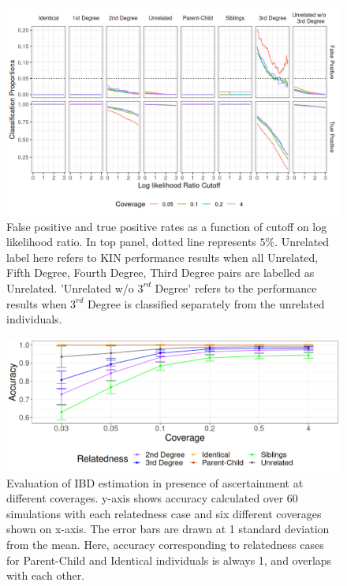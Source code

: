 \documentclass[12pt, letterpaper]{article}
\begin{document}
\begin{figure}[h!]
    \includegraphics[width=16cm]{plots/plotimg/contam0_inbred0_model_performance_allroc_asc0_plot.png}
    \centering
    \caption{False positive and true positive rates as a function of cutoff on log likelihood ratio. In top panel, dotted line represents $5\%$. Unrelated label here refers to KIN performance results when all Unrelated, Fifth Degree, Fourth Degree, Third Degree pairs are labelled as Unrelated. 'Unrelated w/o $3^{rd}$ Degree' refers to the performance results when $3^{rd}$ Degree is classified separately from the unrelated individuals.}
    \label{figS10:cutoff}
\end{figure}

\begin{figure}[h!]
    \centering
    \includegraphics[width=18cm]{plots/plotimg/plot_IBDaccuracy_asc.png}
    \caption{Evaluation of IBD estimation in presence of ascertainment at different coverages. y-axis shows accuracy calculated over 60 simulations with each relatedness case and six different coverages shown on x-axis. The error bars are drawn at 1 standard deviation from the mean. Here, accuracy corresponding to relatedness cases for Parent-Child and Identical individuals is always 1, and overlaps with each other.}
    \label{figS11:ibd_asc}
\end{figure}
\end{document}
